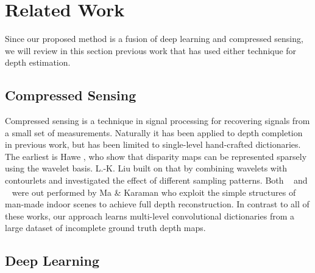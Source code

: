 \section{Related Work}
\label{sec:related-work}

Since our proposed method is a fusion of deep learning and compressed sensing, we will review in this section previous work that has used either technique for depth estimation.

\subsection{Compressed Sensing}
\label{sec:compressed-sensing}


Compressed sensing is a technique in signal processing for recovering signals from a small set of measurements. Naturally it has been applied to depth completion in previous work, but has been limited to single-level hand-crafted dictionaries. The earliest is Hawe \etal, who show that disparity maps can be represented sparsely using the wavelet basis. L.-K. Liu \etal built on that by combining wavelets with contourlets and investigated the effect of different sampling patterns. Both ~\cite{} and ~\cite{} were out performed by Ma \& Karaman who exploit the simple structures of man-made indoor scenes to achieve full depth reconstruction. In contrast to all of these works, our approach learns multi-level convolutional dictionaries from a large dataset of incomplete ground truth depth maps.

\subsection{Deep Learning}
\label{sec:depth-upsampling}


